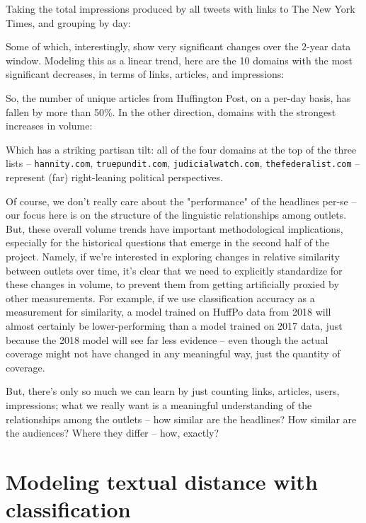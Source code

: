 \documentclass{scrartcl}
\begin{document}
Taking the total impressions produced by all tweets with links to The New York Times, and grouping by day:


Some of which, interestingly, show very significant changes over the 2-year data window. Modeling this as a linear trend, here are the 10 domains with the most significant decreases, in terms of links, articles, and impressions:


So, the number of unique articles from Huffington Post, on a per-day basis, has fallen by more than 50\%. In the other direction, domains with the strongest increases in volume:


Which has a striking partisan tilt: all of the four domains at the top of the three lists -- \texttt{hannity.com}, \texttt{truepundit.com}, \texttt{judicialwatch.com}, \texttt{thefederalist.com} -- represent (far) right-leaning political perspectives.

Of course, we don't really care about the "performance" of the headlines per-se -- our focus here is on the structure of the linguistic relationships among outlets. But, these overall volume trends have important methodological implications, especially for the historical questions that emerge in the second half of the project. Namely, if we're interested in exploring changes in relative similarity between outlets over time, it's clear that we need to explicitly standardize for these changes in volume, to prevent them from getting artificially proxied by other measurements. For example, if we use classification accuracy as a measurement for similarity, a model trained on HuffPo data from 2018 will almost certainly be lower-performing than a model trained on 2017 data, just because the 2018 model will see far less evidence -- even though the actual coverage might not have changed in any meaningful way, just the quantity of coverage.

But, there's only so much we can learn by just counting links, articles, users, impressions; what we really want is a meaningful understanding of the relationships among the outlets -- how similar are the headlines? How similar are the audiences? Where they differ -- how, exactly?

\section{Modeling textual distance with classification}
\end{document}
